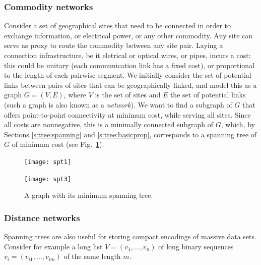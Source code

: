 \documentclass[a4paper]{book}
\theoremstyle{changebreak}                %
\begin{document}
\subsubsection{Commodity networks}
\label{s:tree:network:commodity}
Consider a set of geographical sites that need to be connected in
order to exchange information, or
electrical power, or any other
commodity. Any site can serve as proxy to
route the commodity between any site pair. Laying a
connection infrastructure, be it eletrical or optical wires, or pipes,
incurs a cost: this could be unitary
(each communication link has a fixed cost), or proportional to the
length of each pairwise segment. We initially consider the set of
potential links between pairs of sites that can be
geographically linked, and model this as a graph $G=(V,E)$, where $V$
is the set of sites and $E$ the set of potential links (such a graph
is also known as a {\it network}). We want to find a
subgraph of $G$ that offers point-to-point
connectivity at minimum cost, while serving all
sites. Since all costs are nonnegative, this
is a minimally connected subgraph
of $G$, which, by Sections \ref{s:tree:spanning} and
\ref{s:tree:basicprop}, corresponds to a spanning
tree of $G$ of minimum
cost (see Fig.~\ref{f:sptree}).

\begin{figure}[!ht]
\begin{center}
\begin{minipage}{5cm}
\texttt{[image: spt1]} 
\end{minipage}
\hspace*{1cm}
\begin{minipage}{5cm}
\texttt{[image: spt3]}
\end{minipage}
\end{center}
\caption{A graph with its minimum spanning tree.}
\label{f:sptree}
\end{figure}

\subsubsection{Distance networks}
Spanning trees are also useful for storing compact encodings of
massive data sets. Consider for example a long list
$V=(v_1,\ldots,v_n)$ of long binary sequences
$v_i=(v_{i1},\ldots,v_{im})$ of the same length $m$.
\end{document}
